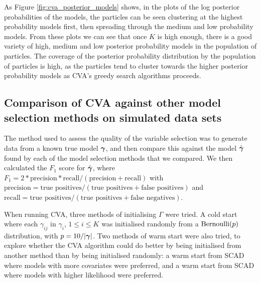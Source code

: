 \documentclass{amsart}[12pt]
\begin{document}
As Figure \ref{fig:cva_posterior_models} shows, 
in the plots of the log posterior probabilities of the models, the particles can be seen clustering at the
highest probability models first, then spreading through the medium and low probability models. From these
plots we can see that once $K$ is high enough, there is a good variety of high, medium and low posterior
probability models in the population of particles. The coverage of the posterior probability distribution
by the population of particles is high, as the particles tend to cluster towards the higher posterior
probability models as CVA's greedy search algorithms proceeds.

\subsection{Comparison of CVA against other model selection methods on simulated data sets}

	
		

The method used to assess the quality of the variable selection was to generate data from a known true model
${\boldsymbol \gamma}$,
and then compare this against the model $\hat{{\boldsymbol \gamma}}$ found by each of the model selection methods that we 
compared.
We then calculated the $F_1$ score for $\hat{{\boldsymbol \gamma}}$,
where
$F_1 = 2 * \text{precision} * \text{recall} / (\text{precision} + \text{recall})$ with
$\text{precision} = \text{true positives} / (\text{true positives} + \text{false positives})$ and
$\text{recall} = \text{true positives} / (\text{true positives} + \text{false negatives})$.

When running CVA,
three methods of initialising $\Gamma$ were tried.
A cold start where each $\gamma_{ij}$ in $\gamma_i$, $1 \leq i \leq K$ was initialised randomly from a
$\text{Bernoulli} (p)$ distribution, with $p = 10 / |{\boldsymbol \gamma}|$.
Two methods of warm start were also tried, to explore whether the CVA algorithm could do better by being
initialised from another method than by being initialised randomly: 
a warm start from SCAD where models with more covariates were preferred, and
a warm start from SCAD where models with higher likelihood were preferred.
\end{document}
